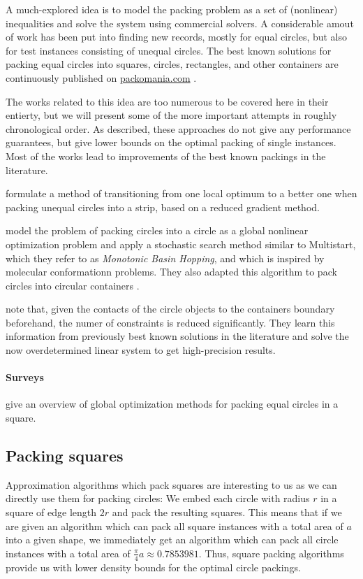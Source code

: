 A much-explored idea is to model the packing problem as a set of (nonlinear) inequalities and solve the system using commercial solvers. A considerable amout of work has been put into finding new records, mostly for equal circles, but also for test instances consisting of unequal circles. The best known solutions for packing equal circles into squares, circles, rectangles, and other containers are continuously published on \url{packomania.com} \cite{specht2015packomania}.

The works related to this idea are too numerous to be covered here in their entierty, but we will present some of the more important attempts in roughly chronological order. As described, these approaches do not give any performance guarantees, but give lower bounds on the optimal packing of single instances. Most of the works lead to improvements of the best known packings in the literature.

\textcite{SY2004mathematical} formulate a method of transitioning from one local optimum to a better one when packing unequal circles into a strip, based on a reduced gradient method.

\textcite{ALS2008disk} model the problem of packing circles into a circle as a global nonlinear optimization problem and apply a stochastic search method similar to Multistart, which they refer to as \emph{Monotonic Basin Hopping}, and which is inspired by molecular conformationn problems. They also adapted this algorithm to pack circles into circular containers \cite{GJLS2009solving}.

\textcite{BG2010new} note that, given the contacts of the circle objects to the containers boundary beforehand, the numer of constraints is reduced significantly. They learn this information from previously best known solutions in the literature and solve the now overdetermined linear system to get high-precision results.

\paragraph{Surveys}

\textcite{SMC2005global} give an overview of global optimization methods for packing equal circles in a square.

\subsection{Packing squares}

Approximation algorithms which pack squares are interesting to us as we can directly use them for packing circles: We embed each circle with radius $r$ in a square of edge length $2r$ and pack the resulting squares.
This means that if we are given an algorithm which can pack all square instances with a total area of $a$ into a given shape, we immediately get an algorithm which can pack all circle instances with a total area of $\frac{\pi}{4}a \approx 0.7853981$. Thus, square packing algorithms provide us with lower density bounds for the optimal circle packings.

